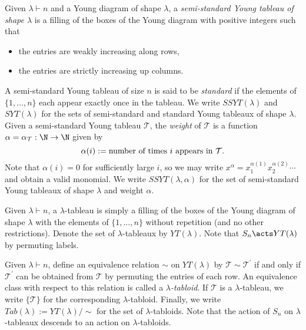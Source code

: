 \documentclass[../main.tex]{subfiles}
\begin{document}
\begin{definition}\label{def:youngtableaux}
  Given $ \lambda\vdash n $ and a Young diagram of shape $ \lambda $, a \textit{semi-standard Young tableau of shape $ \lambda $} is a filling of the boxes of the Young diagram with positive integers such that 
  \begin{itemize}
    \item the entries are weakly increasing along rows,
    \item the entries are strictly increasing up columns.
  \end{itemize}
  A semi-standard Young tableau of size $ n $ is said to be \textit{standard} if the elements of $ \{1,\ldots,n\} $ each appear exactly once in the tableau. We write $ SSYT(\lambda) $ and $ SYT(\lambda) $ for the sets of semi-standard and standard Young tableaux of shape $ \lambda $. Given a semi-standard Young tableau $ \mathcal{T} $, the \textit{weight} of $ \mathcal{T} $ is a function $ \alpha=\alpha_{\mathcal{T}}:\N \to \N$ given by
  \[
    \alpha(i) := \text{number of times $ i $ appears in $ \mathcal{T} $}.
  \]
  Note that $ \alpha(i) = 0 $ for sufficiently large $ i $, so we may write $ x^{\alpha} = x_{1}^{\alpha(1)}x_{2}^{\alpha(2)} \cdots $ and obtain a valid monomial. We write $ SSYT(\lambda,\alpha) $ for the set of semi-standard Young tableaux of shape $ \lambda $ and weight $ \alpha $.
\end{definition}


\begin{definition}\label{def:lambdatableau}
  Given $ \lambda\vdash n $, a $ \lambda $-tableau is simply a filling of the boxes of the Young diagram of shape $ \lambda $ with the elements of $ \{1,\ldots,n\} $ without repetition (and no other restrictions). Denote the set of $ \lambda $-tableaux by $ YT(\lambda) $. Note that $ S_{n}\acts YT(\lambda) $ by permuting labels.
\end{definition}


\begin{definition}\label{def:youngtabloid}
  Given $ \lambda\vdash n $, define an equivalence relation $ \sim $ on $ YT(\lambda) $ by $ \mathcal{T}\sim \mathcal{T}^{\prime} $ if and only if $ \mathcal{T}^{\prime} $ can be obtained from $ \mathcal{T} $ by permuting the entries of each row. %
 An equivalence class with respect to this relation is called a \textit{$ \lambda $-tabloid}. If $ \mathcal{T} $ is a $ \lambda $-tableau, we write $ \{\mathcal{T}\} $ for the corresponding $ \lambda $-tabloid. Finally, we write $ Tab(\lambda):= YT(\lambda)/\sim $ for the set of $ \lambda $-tabloids. Note that the action of $ S_{n} $ on $ \lambda $-tableaux descends to an action on $ \lambda $-tabloids.
\end{definition}
\end{document}
